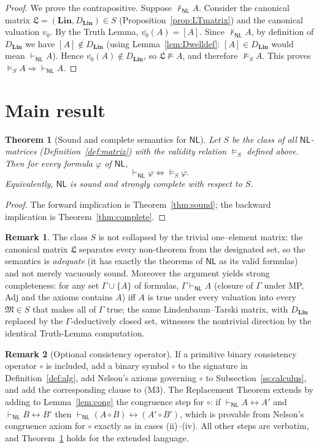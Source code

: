 \documentclass[12pt]{article}
\newtheorem{theorem}{Theorem}
\theoremstyle{definition}
\newtheorem{remark}{Remark}
\newcommand{\NL}{\mathsf{NL}}
\newcommand{\prv}{\vdash_{\NL}}
\newcommand{\vld}{\vDash}
\newcommand{\bic}{\leftrightarrow}
\newcommand{\Lin}{\mathbf{Lin}}
\begin{document}
\begin{proof}
We prove the contrapositive. Suppose $\not\prv A$. Consider the canonical
matrix $\mathfrak L=(\Lin,D_{\Lin})\in S$ (Proposition~\ref{prop:LTmatrix}) and
the canonical valuation $v_{0}$. By the Truth Lemma,
$\overline{v_{0}}(A)=[A]$. Since $\not\prv A$, by definition of $D_{\Lin}$ we
have $[A]\notin D_{\Lin}$ (using Lemma~\ref{lem:Dwelldef}: $[A]\in D_{\Lin}$
would mean $\prv A$). Hence $\overline{v_{0}}(A)\notin D_{\Lin}$, so
$\mathfrak L\not\vld A$, and therefore $\not\vld_{S}A$. This proves
$\vld_{S}A\Rightarrow\prv A$.
\end{proof}

\section{Main result}

\begin{theorem}[Sound and complete semantics for $\NL$]\label{thm:main}
Let $S$ be the class of all $\NL$-matrices (Definition~\ref{def:matrix}) with the
validity relation $\vld_{S}$ defined above. Then for every formula $\varphi$ of
$\NL$,
\[
\prv\varphi \iff \vld_{S}\varphi .
\]
Equivalently, $\NL$ is sound and strongly complete with respect to $S$.
\end{theorem}

\begin{proof}
The forward implication is Theorem~\ref{thm:sound}; the backward implication is
Theorem~\ref{thm:complete}.
\end{proof}

\begin{remark}\label{rem:adequacy}
The class $S$ is not collapsed by the trivial one--element matrix: the canonical
matrix $\mathfrak L$ separates every non-theorem from the designated set, so the
semantics is \emph{adequate} (it has exactly the theorems of $\NL$ as its valid
formulas) and not merely vacuously sound. Moreover the argument yields strong
completeness: for any set $\Gamma\cup\{A\}$ of formulas, $\Gamma\prv A$ (closure
of $\Gamma$ under MP, Adj and the axioms contains $A$) iff $A$ is true under
every valuation into every $\mathfrak M\in S$ that makes all of $\Gamma$ true;
the same Lindenbaum--Tarski matrix, with $D_{\Lin}$ replaced by the
$\Gamma$-deductively closed set, witnesses the nontrivial direction by the
identical Truth-Lemma computation.
\end{remark}

\begin{remark}[Optional consistency operator]\label{rem:consistency}
If a primitive binary consistency operator $\circ$ is included, add a binary
symbol $\circ$ to the signature in Definition~\ref{def:alg}, add Nelson's axioms
governing $\circ$ to Subsection~\ref{ss:calculus}, and add the corresponding
clause to (M3). The Replacement Theorem extends by adding to
Lemma~\ref{lem:cong} the congruence step for $\circ$: if $\prv A\bic A'$ and
$\prv B\bic B'$ then $\prv (A\circ B)\bic(A'\circ B')$, which is provable from
Nelson's congruence axiom for $\circ$ exactly as in cases (ii)--(iv). All other
steps are verbatim, and Theorem~\ref{thm:main} holds for the extended language.
\end{remark}
\end{document}
